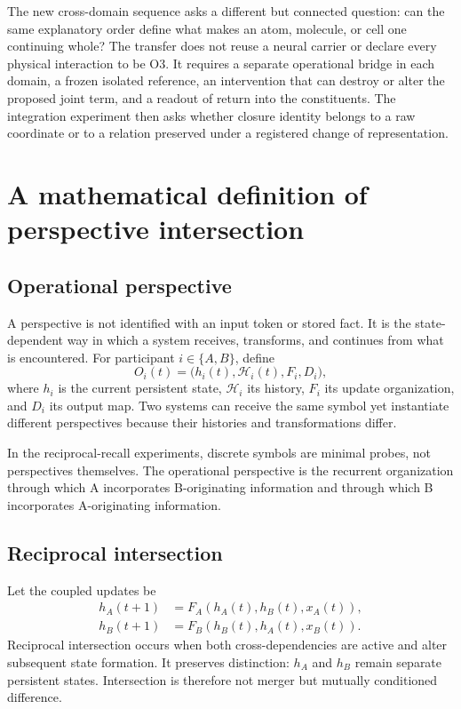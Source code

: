 \documentclass[11pt,a4paper]{article}
\begin{document}
The new cross-domain sequence asks a different but connected question: can the same explanatory order define what makes an atom, molecule, or cell one continuing whole? The transfer does not reuse a neural carrier or declare every physical interaction to be O3. It requires a separate operational bridge in each domain, a frozen isolated reference, an intervention that can destroy or alter the proposed joint term, and a readout of return into the constituents. The integration experiment then asks whether closure identity belongs to a raw coordinate or to a relation preserved under a registered change of representation.

\section{A mathematical definition of perspective intersection}

\subsection{Operational perspective}

A perspective is not identified with an input token or stored fact. It is the state-dependent way in which a system receives, transforms, and continues from what is encountered. For participant $i\in\{A,B\}$, define
\begin{equation}
 O_i(t)=\bigl(h_i(t),\mathcal H_i(t),F_i,D_i\bigr),
 \label{eq:perspective}
\end{equation}
where $h_i$ is the current persistent state, $\mathcal H_i$ its history, $F_i$ its update organization, and $D_i$ its output map. Two systems can receive the same symbol yet instantiate different perspectives because their histories and transformations differ.

In the reciprocal-recall experiments, discrete symbols are minimal probes, not perspectives themselves. The operational perspective is the recurrent organization through which A incorporates B-originating information and through which B incorporates A-originating information.

\subsection{Reciprocal intersection}

Let the coupled updates be
\begin{align}
 h_A(t+1)&=F_A(h_A(t),h_B(t),x_A(t)),\\
 h_B(t+1)&=F_B(h_B(t),h_A(t),x_B(t)).
 \label{eq:coupled}
\end{align}
Reciprocal intersection occurs when both cross-dependencies are active and alter subsequent state formation. It preserves distinction: $h_A$ and $h_B$ remain separate persistent states. Intersection is therefore not merger but mutually conditioned difference.
\end{document}
